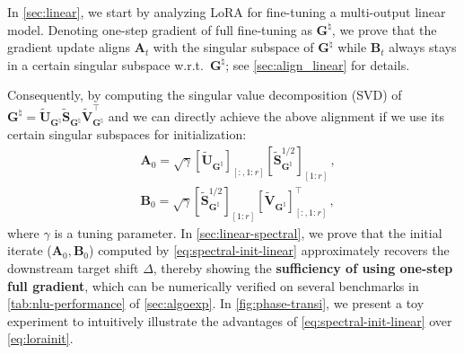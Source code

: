 In \cref{sec:linear}, we start by analyzing LoRA for fine-tuning a multi-output linear model. Denoting one-step gradient of full fine-tuning as $\bm G^{\natural}$, we prove that the gradient update aligns $\bm A_t$ with the singular subspace of $\bm G^{\natural}$ while $\bm B_t$ always stays in a certain singular subspace w.r.t.\ $\bm G^{\natural}$; see \cref{sec:align_linear} for details.

Consequently, by computing the singular value decomposition (SVD) of ${\bm G}^{\natural} = \widetilde{\bm U}_{\bm G^\natural} \widetilde{\bm S}_{\bm G^\natural} \widetilde{\bm V}_{{\bm G^\natural}}^{\!\top}$ and we can directly achieve the above alignment if we use its certain singular subspaces for initialization:
\begin{equation}\tag{Spectral-init}\label{eq:spectral-init-linear}
\begin{split}
       &\bm A_0 = \sqrt{\gamma}\left[\widetilde{\bm U}_{\bm G^\natural}\right]_{[:,1:r]}\left[\widetilde{\bm S}_{\bm G^\natural}^{1/2}\right]_{[1:r]}\,,\\
    &\bm B_0 = \sqrt{\gamma}\left[\widetilde{\bm S}_{\bm G^\natural}^{1/2}\right]_{[1:r]}\left[\widetilde{\bm V}_{\bm G^\natural}\right]_{[:,1:r]}^{\!\top}\,, 
\end{split}
\end{equation}
where $\gamma$ is a tuning parameter.
In \cref{sec:linear-spectral}, we prove that the initial iterate ($\bm A_0, \bm B_0$) computed by  \eqref{eq:spectral-init-linear} approximately recovers the downstream target shift $\Delta$, thereby showing the {\bf sufficiency of using one-step full gradient}, which can be numerically verified on several benchmarks in \cref{tab:nlu-performance} of \cref{sec:algoexp}. In \cref{fig:phase-transi}, we present a toy experiment to intuitively illustrate the advantages of \cref{eq:spectral-init-linear} over \cref{eq:lorainit}. 

